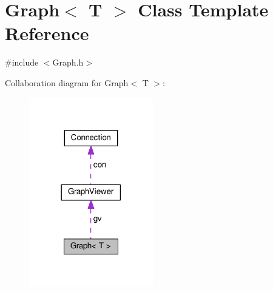 \hypertarget{classGraph}{}\section{Graph$<$ T $>$ Class Template Reference}
\label{classGraph}


{\ttfamily \#include $<$Graph.\+h$>$}



Collaboration diagram for Graph$<$ T $>$\+:
\nopagebreak
\begin{figure}[H]
\begin{center}
\leavevmode
\includegraphics[width=153pt]{classGraph__coll__graph}
\end{center}
\end{figure}
